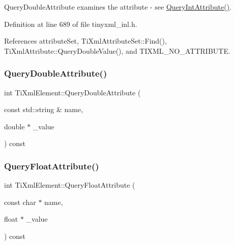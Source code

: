 Query\+Double\+Attribute examines the attribute -\/ see \hyperlink{class_ti_xml_element_a5c0f739e0f6f5905a201364532e54a60}{Query\+Int\+Attribute()}. 



Definition at line 689 of file tinyxml\+\_\+inl.\+h.



References attribute\+Set, Ti\+Xml\+Attribute\+Set\+::\+Find(), Ti\+Xml\+Attribute\+::\+Query\+Double\+Value(), and T\+I\+X\+M\+L\+\_\+\+N\+O\+\_\+\+A\+T\+T\+R\+I\+B\+U\+TE.

\hypertarget{class_ti_xml_element_a442a0180263ff9a61d30711dc213d9e4}{}\label{class_ti_xml_element_a442a0180263ff9a61d30711dc213d9e4} 
\subsubsection{\texorpdfstring{Query\+Double\+Attribute()}{QueryDoubleAttribute()}\hspace{0.1cm}{\footnotesize\ttfamily [2/2]}}
{\footnotesize\ttfamily int Ti\+Xml\+Element\+::\+Query\+Double\+Attribute (\begin{DoxyParamCaption}\item[{const std\+::string \&}]{name,  }\item[{double $\ast$}]{\+\_\+value }\end{DoxyParamCaption}) const}

\hypertarget{class_ti_xml_element_a5591929834178699b4561ab6ab460068}{}\label{class_ti_xml_element_a5591929834178699b4561ab6ab460068} 
\subsubsection{\texorpdfstring{Query\+Float\+Attribute()}{QueryFloatAttribute()}}
{\footnotesize\ttfamily int Ti\+Xml\+Element\+::\+Query\+Float\+Attribute (\begin{DoxyParamCaption}\item[{const char $\ast$}]{name,  }\item[{float $\ast$}]{\+\_\+value }\end{DoxyParamCaption}) const\hspace{0.3cm}{\ttfamily [inline]}}



